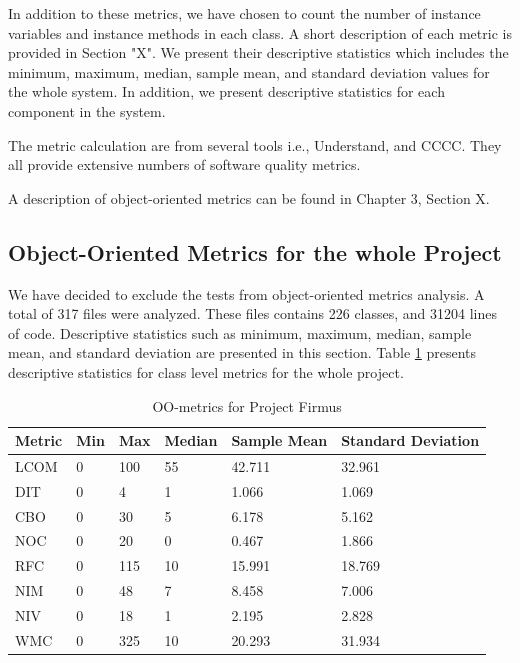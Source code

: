 In addition to these metrics, we have chosen to count the number of instance variables and instance methods in each class. A short description of each metric is provided in Section "X". We present their descriptive statistics which includes the minimum, maximum, median, sample mean, and standard deviation values for the whole system. In addition, we present descriptive statistics for each component in the system.

The metric calculation are from several tools i.e., Understand, and CCCC. They all provide extensive numbers of software quality metrics.


A description of object-oriented metrics can be found in Chapter 3, Section X. 


\subsection{Object-Oriented Metrics for the whole Project}
 We have decided to exclude the tests from object-oriented metrics analysis. A total of 317 files were analyzed. These files contains 226 classes, and 31204 lines of code. Descriptive statistics such as minimum, maximum, median, sample mean, and standard deviation are presented in this section. Table \ref{tab:oometrics-firmus} presents descriptive statistics for class level metrics for the whole project.

\begin{table}[]
\centering
\caption{OO-metrics for Project Firmus}
\label{tab:oometrics-firmus}
\begin{tabular}{|l|l|l|l|l|l|}
\hline
\textbf{Metric} & \textbf{Min} & \textbf{Max} & \textbf{Median} & \textbf{Sample Mean} & \textbf{Standard Deviation} \\ \hline
LCOM            & 0            & 100          & 55              & 42.711               & 32.961                      \\ \hline
DIT             & 0            & 4            & 1               & 1.066                & 1.069                       \\ \hline
CBO             & 0            & 30           & 5               & 6.178                & 5.162                       \\ \hline
NOC             & 0            & 20           & 0               & 0.467                & 1.866                       \\ \hline
RFC             & 0            & 115          & 10              & 15.991               & 18.769                      \\ \hline
NIM             & 0            & 48           & 7               & 8.458                & 7.006                       \\ \hline
NIV             & 0            & 18           & 1               & 2.195                & 2.828                       \\ \hline
WMC            & 0            & 325          & 10              & 20.293                 & 31.934                      \\ \hline
\end{tabular}
\end{table}

